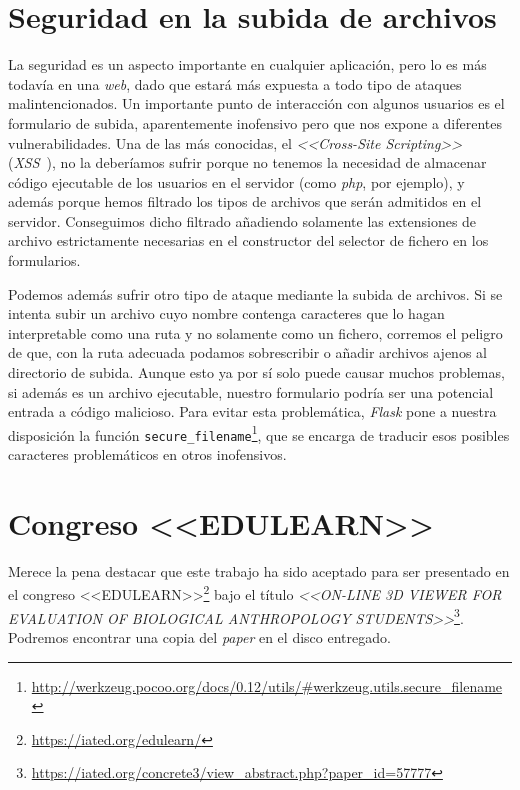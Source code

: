 \section{Seguridad en la subida de archivos}
La seguridad es un aspecto importante en cualquier aplicación, pero lo es más todavía en una \textit{web}, dado que estará más expuesta a todo tipo de ataques malintencionados. Un importante punto de interacción con algunos usuarios es el formulario de subida, aparentemente inofensivo pero que nos expone a diferentes vulnerabilidades. Una de las más conocidas, el \textit{<<Cross-Site Scripting>>} (\textit{XSS}~\cite{wiki:XSS}\cite{flask-docs:XSS}), no la deberíamos sufrir porque no tenemos la necesidad de almacenar código ejecutable de los usuarios en el servidor (como \textit{php}, por ejemplo), y además porque hemos filtrado los tipos de archivos que serán admitidos en el servidor. Conseguimos dicho filtrado añadiendo solamente las extensiones de archivo estrictamente necesarias en el constructor del selector de fichero en los formularios.

Podemos además sufrir otro tipo de ataque mediante la subida de archivos. Si se intenta subir un archivo cuyo nombre contenga caracteres que lo hagan interpretable como una ruta y no solamente como un fichero, corremos el peligro de que, con la ruta adecuada podamos sobrescribir o añadir archivos ajenos al directorio de subida. Aunque esto ya por sí solo puede causar muchos problemas, si además es un archivo ejecutable, nuestro formulario podría ser una potencial entrada a código malicioso. Para evitar esta problemática, \textit{Flask} pone a nuestra disposición la función \texttt{secure\_filename}\footnote{\url{http://werkzeug.pocoo.org/docs/0.12/utils/\#werkzeug.utils.secure_filename}}, que se encarga de traducir esos posibles caracteres problemáticos en otros inofensivos.

\section{Congreso <<EDULEARN>>}
Merece la pena destacar que este trabajo ha sido aceptado para ser presentado en el congreso <<EDULEARN>>\footnote{\url{https://iated.org/edulearn/}} bajo el título \textit{<<ON-LINE 3D VIEWER FOR EVALUATION OF BIOLOGICAL ANTHROPOLOGY STUDENTS>>}\footnote{\url{https://iated.org/concrete3/view_abstract.php?paper_id=57777}}. Podremos encontrar una copia del \textit{paper} en el disco entregado.